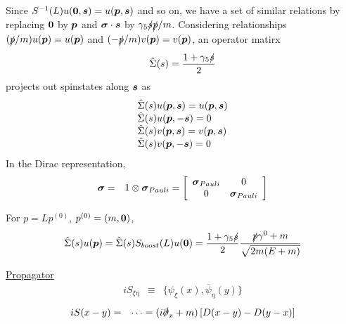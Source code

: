 Since $S^{-1}(L) u(\mbox{\boldmath $0$},\mbox{\boldmath $s$}) = u(\mbox{\boldmath $p$},\mbox{\boldmath $s$})$ and so on, we have
a set of similar relations by replacing $\mbox{\boldmath $0$}$ by $\mbox{\boldmath $p$}$ and
$\mbox{\boldmath $\sigma$}\cdot \mbox{\boldmath $s$}$ by $\gamma_5 \slashed{s} \slashed{p} / m$.
Considering relationships $(\slashed{p}/m)u(\mbox{\boldmath $p$}) = u(\mbox{\boldmath $p$})$
and $(-\slashed{p}/m)v(\mbox{\boldmath $p$}) = v(\mbox{\boldmath $p$})$, an operator matirx
\begin{eqnarray}
\hat{\Sigma}(s)
 = 
\frac{1 + \gamma_5 \slashed{s}}{2}
 \end{eqnarray}
projects out 
spinstates along $\mbox{\boldmath $s$}$ as
\begin{eqnarray}
\begin{array}{l}
\hat{\Sigma}(s) u(\mbox{\boldmath $p$}, \mbox{\boldmath $s$}) = u(\mbox{\boldmath $p$}, \mbox{\boldmath $s$})
\\
\hat{\Sigma}(s) u(\mbox{\boldmath $p$}, -\mbox{\boldmath $s$}) = 0
\\
\hat{\Sigma}(s) v(\mbox{\boldmath $p$}, \mbox{\boldmath $s$}) = v(\mbox{\boldmath $p$}, \mbox{\boldmath $s$})
\\
\hat{\Sigma}(s) v(\mbox{\boldmath $p$}, -\mbox{\boldmath $s$}) = 0
\end{array}
\end{eqnarray}
In the Dirac representation,
\begin{eqnarray}
\mbox{\boldmath $\sigma$}
&=&
1 \otimes \mbox{\boldmath $\sigma$}_{Pauli}
=
\left[
\begin{array}{cc}
\mbox{\boldmath $\sigma$}_{Pauli} & 0 \\
0 & \mbox{\boldmath $\sigma$}_{Pauli}
\end{array}
\right]
\end{eqnarray}


\bigskip

For $p = Lp^{(0)}$, $p^{(0)} = (m, \mbox{\boldmath $0$})$,
\begin{eqnarray}
\hat{\Sigma}(s) u(\mbox{\boldmath $p$})
=
\hat{\Sigma}(s)
S_{boost}(L)
u(\mbox{\boldmath $0$})
=
\frac{1 + \gamma_5 \slashed{s}}{2}
\frac{\slashed{p}\gamma^0 + m}{\sqrt{2m(E+m)}}
\end{eqnarray}


\noindent
\underline{Propagator}\\
\begin{eqnarray}
i S_{\xi \eta} &\equiv&
\{
\psi_\xi (x) , \overline{\psi}_\eta (y) \}
\end{eqnarray}
\begin{eqnarray}
iS(x - y)
&=& 
\dots
=
(i \slashed{\partial}_x + m)
\left[
D(x-y) - D(y - x)
\right]
\end{eqnarray}

